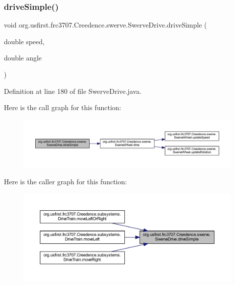 \subsubsection{\texorpdfstring{driveSimple()}{driveSimple()}}
{\footnotesize\ttfamily void org.\+usfirst.\+frc3707.\+Creedence.\+swerve.\+Swerve\+Drive.\+drive\+Simple (\begin{DoxyParamCaption}\item[{double}]{speed,  }\item[{double}]{angle }\end{DoxyParamCaption})}



Definition at line 180 of file Swerve\+Drive.\+java.

Here is the call graph for this function\+:
\nopagebreak
\begin{figure}[H]
\begin{center}
\leavevmode
\includegraphics[width=350pt]{classorg_1_1usfirst_1_1frc3707_1_1_creedence_1_1swerve_1_1_swerve_drive_aa3f4d7f38e0a6a511d5ea4fa1871dbe4_cgraph}
\end{center}
\end{figure}
Here is the caller graph for this function\+:
\nopagebreak
\begin{figure}[H]
\begin{center}
\leavevmode
\includegraphics[width=350pt]{classorg_1_1usfirst_1_1frc3707_1_1_creedence_1_1swerve_1_1_swerve_drive_aa3f4d7f38e0a6a511d5ea4fa1871dbe4_icgraph}
\end{center}
\end{figure}
\mbox{\label{classorg_1_1usfirst_1_1frc3707_1_1_creedence_1_1swerve_1_1_swerve_drive_a4a78f8451f4d7b85e3b88395a92a7218}} 
